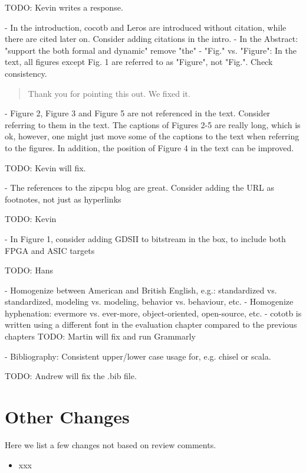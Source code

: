 \documentclass{article}
\newcommand{\todo}[1]{{\color{olive} TODO: #1}}
\newcommand{\reply}[1]{{\color{blue} #1}}
\begin{document}
\todo{Kevin writes a response.}

- In the introduction, cocotb and Leros are introduced without citation, while there are cited later on. Consider adding citations in the intro.
- In the Abstract: "support the both formal and dynamic" remove "the"
- "Fig." vs. "Figure": In the text, all figures except Fig. 1 are referred to as "Figure", not "Fig.". Check consistency.

\begin{quote}
\reply{Thank you for pointing this out. We fixed it.}
\end{quote}

- Figure 2, Figure 3 and Figure 5 are not referenced in the text. Consider referring to them in the text. The captions of Figures 2-5 are really long, which is ok, however, one might just move some of the captions to the text when referring to the figures. In addition, the position of Figure 4 in the text can be improved. 

\todo{Kevin will fix.}

- The references to the zipcpu blog are great. Consider adding the URL as footnotes, not just as hyperlinks

\todo{Kevin}

- In Figure 1, consider adding GDSII to bitstream in the box, to include both FPGA and ASIC targets

\todo{Hans}

- Homogenize between American and British English, e.g.: standardized vs. standardized, modeling vs. modeling, behavior vs. behaviour, etc.
- Homogenize hyphenation: evermore vs. ever-more, object-oriented, open-source, etc.
- cototb is written using a different font in the evaluation chapter compared to the previous chapters
\todo{Martin will fix and run Grammarly}

- Bibliography: Consistent upper/lower case usage for, e.g. chisel or scala.

\todo{Andrew will fix the .bib file.}




\section*{Other Changes}

Here we list a few changes not based on review comments.

\begin{itemize}
	\item xxx
\end{itemize}
\end{document}
